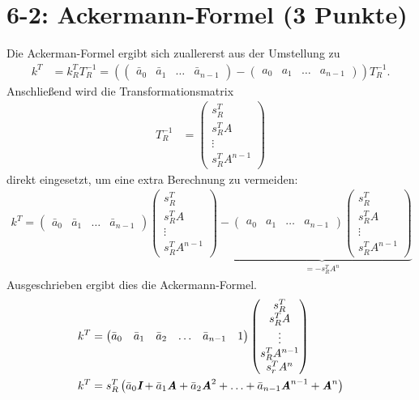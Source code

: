 \documentclass[11pt]{scrartcl} %
\begin{document}
\section*{6-2: Ackermann-Formel (3 Punkte)}
Die Ackerman-Formel ergibt sich zuallererst aus der Umstellung zu
\begin{align*}
k^T &= k_R^TT_R^{-1} = \left( \begin{pmatrix}
\bar{a}_0 & \bar{a}_1 & \hdots & \bar{a}_{n-1}
\end{pmatrix} - \begin{pmatrix}
a_0 & a_1 & \hdots & a_{n-1}
\end{pmatrix} 
\right) T_R^{-1}.
\end{align*}
Anschließend wird die Transformationsmatrix
\begin{align*}
T_R^{-1} &= \begin{pmatrix}
s_R^T \\
s_R^TA \\
\vdots \\
s_R^TA^{n-1}
\end{pmatrix}
\end{align*}
direkt eingesetzt, um eine extra Berechnung zu vermeiden:
\begin{align*}
k^T=\begin{pmatrix}
\bar{a}_0 & \bar{a}_1 & \hdots & \bar{a}_{n-1}
\end{pmatrix} \begin{pmatrix}
s_R^T \\
s_R^TA \\
\vdots \\
s_R^TA^{n-1}
\end{pmatrix} - \underbrace{\begin{pmatrix}
a_0 & a_1 & \hdots & a_{n-1}
\end{pmatrix} \begin{pmatrix}
s_R^T \\
s_R^TA \\
\vdots \\
s_R^TA^{n-1}
\end{pmatrix}}_{=-s_R^TA^n}
\end{align*}
Ausgeschrieben ergibt dies die Ackermann-Formel.
\begin{align*}
k^T &= \begin{pmatrix}
\bar{a}_0 & \bar{a}_1 & \bar{a}_2 & \hdots & \bar{a}_{n-1} & 1
\end{pmatrix} \begin{pmatrix}
s_R^T \\
s_R^TA \\
\vdots \\
s_R^TA^{n-1} \\
s_r^TA^n
\end{pmatrix} \\
k^T &= s_R^T \left( \bar{a}_0\textit{\textbf{I}} + \bar{a}_1\textit{\textbf{A}} + \bar{a}_2\textit{\textbf{A}}^2 +  \hdots + \bar{a}_{n-1}\textit{\textbf{A}}^{n-1} + \textbf{\textit{A}}^n \right)
\end{align*}
\end{document}
